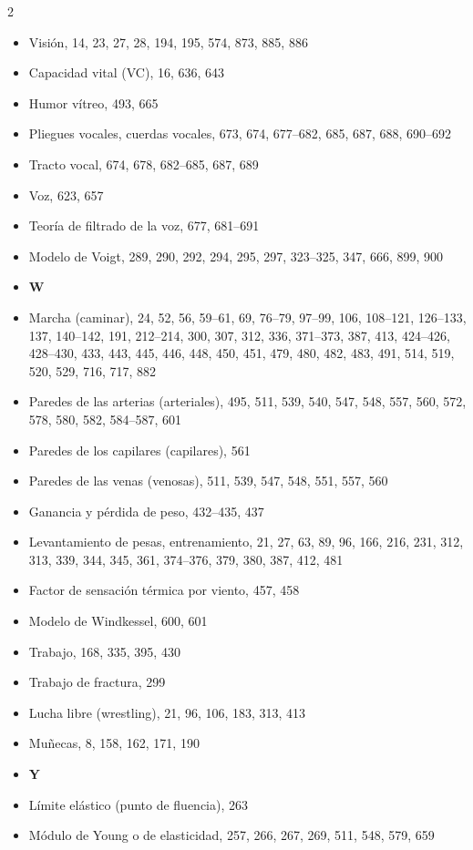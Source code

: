 \documentclass[12pt,a4paper]{book}
\begin{document}
\begin{multicols}{2}
\begin{itemize}[leftmargin=*]
  \item Visión, 14, 23, 27, 28, 194, 195, 574, 873, 885, 886
  \item Capacidad vital (VC), 16, 636, 643
  \item Humor vítreo, 493, 665
  \item Pliegues vocales, cuerdas vocales, 673, 674, 677--682, 685, 687, 688, 690--692
  \item Tracto vocal, 674, 678, 682--685, 687, 689
  \item Voz, 623, 657
  \item Teoría de filtrado de la voz, 677, 681--691
  \item Modelo de Voigt, 289, 290, 292, 294, 295, 297, 323--325, 347, 666, 899, 900
  \item \textbf{W}
  \item Marcha (caminar), 24, 52, 56, 59--61, 69, 76--79, 97--99, 106, 108--121, 126--133, 137, 140--142, 191, 212--214, 300, 307, 312, 336, 371--373, 387, 413, 424--426, 428--430, 433, 443, 445, 446, 448, 450, 451, 479, 480, 482, 483, 491, 514, 519, 520, 529, 716, 717, 882
  \item Paredes de las arterias (arteriales), 495, 511, 539, 540, 547, 548, 557, 560, 572, 578, 580, 582, 584--587, 601
  \item Paredes de los capilares (capilares), 561
  \item Paredes de las venas (venosas), 511, 539, 547, 548, 551, 557, 560
  \item Ganancia y pérdida de peso, 432--435, 437
  \item Levantamiento de pesas, entrenamiento, 21, 27, 63, 89, 96, 166, 216, 231, 312, 313, 339, 344, 345, 361, 374--376, 379, 380, 387, 412, 481
  \item Factor de sensación térmica por viento, 457, 458
  \item Modelo de Windkessel, 600, 601
  \item Trabajo, 168, 335, 395, 430
  \item Trabajo de fractura, 299
  \item Lucha libre (wrestling), 21, 96, 106, 183, 313, 413
  \item Muñecas, 8, 158, 162, 171, 190
  \item \textbf{Y}
  \item Límite elástico (punto de fluencia), 263
  \item Módulo de Young o de elasticidad, 257, 266, 267, 269, 511, 548, 579, 659
\end{itemize}
\end{multicols}
\end{document}
